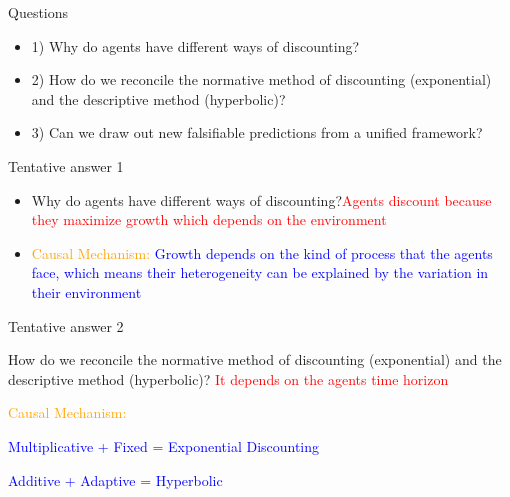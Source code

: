 \documentclass{beamer}
\numberwithin{equation}{section}
\begin{document}
\begin{frame}{Questions}
\begin{itemize}
    \item 1) Why do agents have different ways of discounting?
    \item 2) How do we reconcile the normative method of discounting (exponential) and the descriptive method (hyperbolic)?
    \item 3) Can we draw out new falsifiable predictions from a unified framework? 
\end{itemize}
\end{frame}
\begin{frame}{Tentative answer 1}
\begin{itemize}
    \item Why do agents have different ways of discounting?\textcolor{red}{Agents discount because they maximize growth which depends on the environment}
    \item \textcolor{orange}{Causal Mechanism:} \textcolor{blue}{Growth depends on the kind of process that the agents face, which means their heterogeneity can be explained by the variation in their environment}
\end{itemize}
\end{frame}
\begin{frame}{Tentative answer 2}
\begin{itemize}
    \item How do we reconcile the normative method of discounting (exponential) and the descriptive method (hyperbolic)? \textcolor{red}{It depends on the agents time horizon}
    \item \textcolor{orange}{Causal Mechanism:} \textcolor{blue}{
    \item Multiplicative + Fixed = Exponential Discounting
    \item Additive + Adaptive = Hyperbolic}
\end{itemize}
\end{frame}
\end{document}
